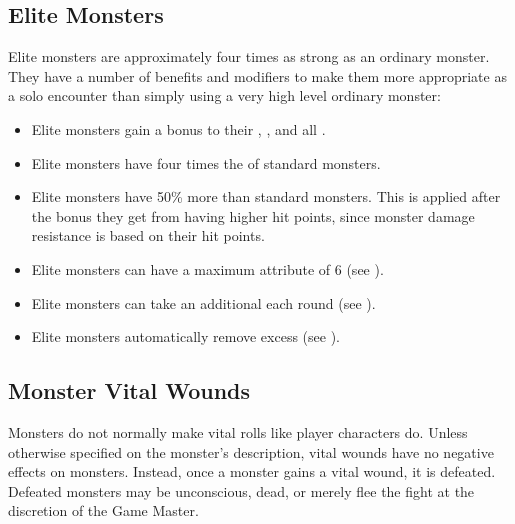     \subsection{Elite Monsters}\label{Elite Monsters}
        Elite monsters are approximately four times as strong as an ordinary monster.
        They have a number of benefits and modifiers to make them more appropriate as a solo encounter than simply using a very high level ordinary monster:
        \begin{itemize}
            \item Elite monsters gain a  bonus to their , , and all .
            \item Elite monsters have four times the  of standard monsters.
            \item Elite monsters have 50\% more  than standard monsters. This is applied after the bonus they get from having higher hit points, since monster damage resistance is based on their hit points.
            \item Elite monsters can have a maximum attribute of 6 (see ).
            \item Elite monsters can take an additional  each round (see ).
            \item Elite monsters automatically remove excess  (see ).
        \end{itemize}

        \subsection{Monster Vital Wounds}
            Monsters do not normally make vital rolls like player characters do.
            Unless otherwise specified on the monster's description, vital wounds have no negative effects on monsters.
            Instead, once a monster gains a vital wound, it is defeated.
            Defeated monsters may be unconscious, dead, or merely flee the fight at the discretion of the Game Master.

